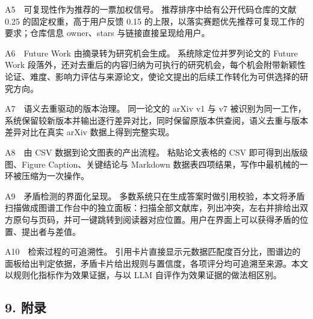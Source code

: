 \documentclass[UTF8,fontset=windows,zihao=5,a4paper]{ctexart}
\begin{document}
A5　可复现性作为推荐的一票加权信号。 推荐排序中给有公开代码仓库的文献 0.25 的固定权重，高于用户反馈 0.15 的上限，以落实赛题优先推荐可复现工作的要求；仓库信息 owner、stars 与链接直接呈现给用户。

A6　Future Work 由摘录转为研究机会生成。 系统除定位并罗列论文的 Future Work 段落外，还对去重后的内容归纳为可执行的研究机会，每个机会附带新颖性论证、难度、影响力评估与来源论文，使论文提出的后续工作转化为可供选择的研究方向。

A7　语义去重驱动的版本治理。 同一论文的 arXiv v1 与 v7 被识别为同一工作，系统保留较新版本并输出逐行差异对比，同时保留原版本供查阅，语义去重与版本差异对比在真实 arXiv 数据上得到完整实现。

A8　由 CSV 数据到论文图表的产出流程。 粘贴论文表格的 CSV 即可得到出版级图、Figure Caption、关键结论与 Markdown 数据表四项结果，写作中最机械的一环被压缩为一次操作。

A9　矛盾检测的界面化呈现。 多数系统只在生成答案时做引用校验，本文将矛盾扫描做成图谱工作台中的独立面板：扫描全部文献库，列出冲突，左右并排给出双方原句与页码，并可一键跳转到阅读器对应位置。用户在界面上可以获得矛盾的位置、提出者与差值。

A10　检索过程的可追溯性。 引用卡片直接显示元数据匹配度百分比，图谱边的面板给出判定依据，矛盾卡片给出规则与置信度，各项评分均可追溯至来源。本文以规则化指标作为效果证据，与以 LLM 自评作为效果证据的做法相区别。

\subsection*{9. 附录}
\end{document}
